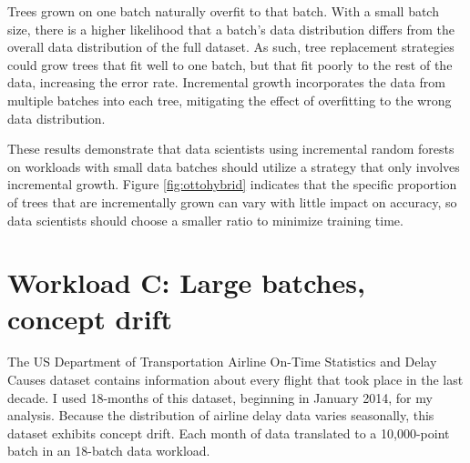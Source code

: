 Trees grown on one batch naturally overfit to that batch. With a small batch
size, there is a higher likelihood that a batch's data distribution differs from the
overall data distribution of the full dataset. As such, tree replacement
strategies could grow trees that fit well to one batch, but that fit poorly to
the rest of the data, increasing the error rate. Incremental growth
incorporates the data from multiple batches into each tree, mitigating the
effect of overfitting to the wrong data distribution.

These results demonstrate that data scientists using incremental
random forests on workloads with small data batches should utilize a strategy
that only involves incremental growth. Figure \ref{fig:ottohybrid} indicates
that the specific proportion of trees that are incrementally grown can vary
with little impact on accuracy, so data scientists should choose a smaller
ratio to minimize training time.

\section{Workload C: Large batches, concept drift}

The US Department of Transportation Airline On-Time Statistics and Delay Causes
dataset contains information about every flight that took place in the last
decade. I used 18-months of this dataset, beginning in January 2014, for my
analysis. Because the distribution of airline delay data varies seasonally,
this dataset exhibits concept drift. Each month of data translated to a
10,000-point batch in an 18-batch data workload. \cite{Plane}

